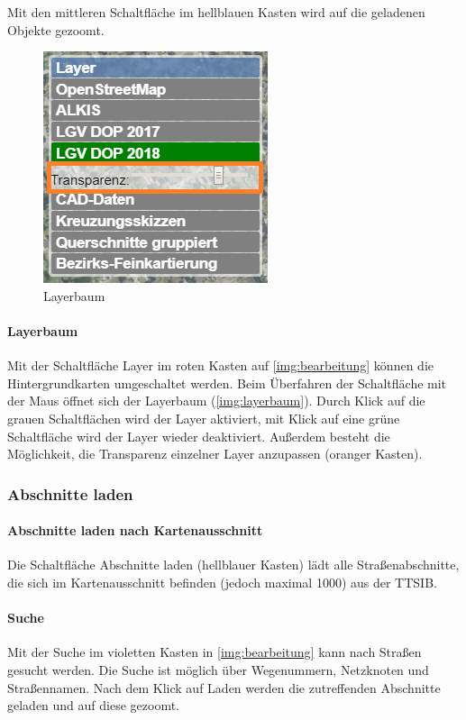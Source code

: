 \documentclass[a4paper,11pt,bibliography=totoc, listof=totoc,titlepage]{scrartcl}
\begin{document}
Mit den mittleren Schaltfläche im hellblauen Kasten wird auf die geladenen Objekte gezoomt. 

\begin{figure}
 \centering
 \includegraphics[width=.4\textwidth]{./img/layerbaum.png}
 \caption{Layerbaum}
 \label{img:layerbaum}
\end{figure}

\paragraph{Layerbaum} Mit der Schaltfläche Layer im roten Kasten auf \autoref{img:bearbeitung} können die Hintergrundkarten umgeschaltet werden. Beim Überfahren der Schaltfläche mit der Maus öffnet sich der Layerbaum (\autoref{img:layerbaum}). Durch Klick auf die grauen Schaltflächen wird der Layer aktiviert, mit Klick auf eine grüne Schaltfläche wird der Layer wieder deaktiviert. Außerdem besteht die Möglichkeit, die Transparenz einzelner Layer anzupassen (oranger Kasten). 

\subsubsection{Abschnitte laden}
\paragraph{Abschnitte laden nach Kartenausschnitt}
Die Schaltfläche Abschnitte laden (hellblauer Kasten) lädt alle Straßenabschnitte, die sich im Kartenausschnitt befinden (jedoch maximal 1000) aus der TTSIB.

\paragraph{Suche}
Mit der Suche im violetten Kasten in \autoref{img:bearbeitung} kann nach Straßen gesucht werden. Die Suche ist möglich über Wegenummern, Netzknoten und Straßennamen. Nach dem Klick auf Laden werden die zutreffenden Abschnitte geladen und auf diese gezoomt.
\end{document}
